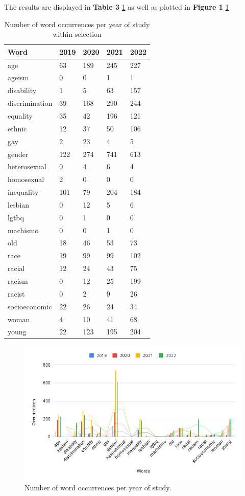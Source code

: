 \documentclass[runningheads]{llncs}
\begin{document}
The results are displayed in \textbf{Table 3}\textit{} \ref{tab3} as well as plotted in \textbf{Figure 1}\textit{} \ref{chart}
\begin{table}
\caption{Number of word occurrences per year of study within selection}\label{tab3}
\centering
\begin{tabular}{|l|l|l|l|l|}
\hline
Word &  2019 & 2020 & 2021 & 2022\\
\hline
age & 63 & 189 & 245 & 227 \\
ageism & 0 & 0 & 1 & 1 \\
disability & 1 & 5 & 63 & 157 \\
discrimination & 39 & 168 & 290 & 244 \\
equality & 35 & 42 & 196 & 121 \\ 
ethnic & 12 & 37 & 50 & 106 \\
gay & 2 & 23 & 4 & 5 \\
gender &122 &274 &741 &613 \\
heterosexual &0 &4 &6 &4 \\
homosexual &2 &0 &0 &0 \\
inequality &101 &79 &204 &184 \\
lesbian &0 &12 &5 &6 \\
lgtbq &0 &1 &0 &0 \\
machismo &0 &0 &1 &0 \\old &18 &46 &53 &73 \\
race &19 &99 &99 &102 \\
racial &12 &24 &43 &75 \\
racism &0 &12 &25 &199 \\
racist &0 &2 &9 &26 \\
socioeconomic &22 &26 &24 &34 \\
woman &4 &10 &41 &68 \\
young &22 &123 &195 &204 \\
\hline
\end{tabular}
\end{table}
\begin{figure}
\includegraphics[width=\textwidth]{chart.png}
\centering
\caption{Number of word occurrences per year of study.} \label{chart}
\end{figure}
\end{document}
